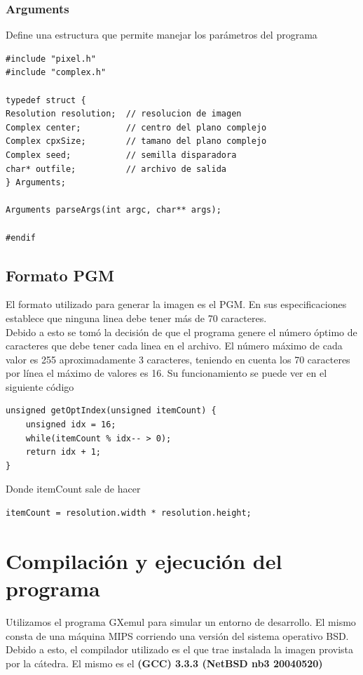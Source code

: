 \documentclass [12pt, a4paper]{article}
\begin{document}
\subsubsection{\textbf{Arguments}}
Define una estructura que permite manejar los parámetros del programa
\begin{lstlisting}[frame=single]
#include "pixel.h"
#include "complex.h"

typedef struct {
Resolution resolution;  // resolucion de imagen
Complex center;         // centro del plano complejo
Complex cpxSize;        // tamano del plano complejo
Complex seed;           // semilla disparadora
char* outfile;          // archivo de salida
} Arguments;

Arguments parseArgs(int argc, char** args);

#endif

\end{lstlisting}
	
\subsection{Formato PGM}
	El formato utilizado para generar la imagen es el PGM. En sus especificaciones establece que ninguna linea debe tener más de 70 caracteres.\\Debido a esto se tomó la decisión de que el programa genere el número óptimo de caracteres que debe tener cada linea en el archivo. El número máximo de cada valor es 255 aproximadamente 3 caracteres, teniendo en cuenta los 70 caracteres por línea el máximo de valores es 16. Su funcionamiento se puede ver en el siguiente código 
	
	\begin{lstlisting}[frame=single]
unsigned getOptIndex(unsigned itemCount) {
	unsigned idx = 16;
	while(itemCount % idx-- > 0);
	return idx + 1;
}
	\end{lstlisting}
	\vspace{5mm} Donde itemCount sale de hacer
	\begin{lstlisting}[frame=single]
itemCount = resolution.width * resolution.height;
	\end{lstlisting}	
	\clearpage
	\section{Compilación y ejecución del programa}
	
	Utilizamos el programa GXemul para simular un entorno de desarrollo. El mismo consta de una máquina MIPS corriendo una versión del sistema operativo BSD. Debido a esto, el compilador utilizado es el que trae instalada la imagen provista por la cátedra. El mismo es el \textbf{(GCC) 3.3.3 (NetBSD nb3 20040520)}
	\\\\
\end{document}
